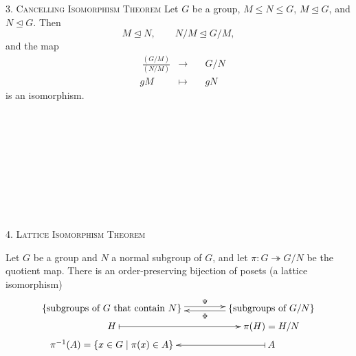 \documentclass[12pt]{amsart}
\begin{document}
\newpage

\begin{framed}
\textsc{3. Cancelling Isomorphism Theorem}
Let $G$ be a group, $M \leq N \leq G$, $M \trianglelefteq G$, and $N \trianglelefteq G$. Then 
$$M \trianglelefteq N, \qquad N/M \trianglelefteq G/M,$$ 
and the map
\[\begin{aligned} & \ \frac{(G/M)}{(N/M)}  &\longrightarrow & \quad G/N\\ 
& gM &\mapsto &\quad gN \end{aligned}\] 
is an isomorphism.

\

\

\

\

\

\textsc{4. Lattice Isomorphism Theorem}

Let $G$ be a group and $N$ a normal subgroup of $G$, and let $\pi\!: G \twoheadrightarrow G/N$ be the quotient map. There is an order-preserving bijection of posets (a lattice isomorphism)
$$\xymatrix@R=1mm@C=15mm{
\{\text{subgroups of $G$ that contain $N$}\} \ar@<0.5ex>[r]^-{\Psi} & \ar@<0.5ex>[l]^-{\Phi} \{\text{subgroups of $G/N$}\} \\
H \ar@{|->}[r] & \pi(H)= H/N \\
\pi^{-1}(A) = \{x \in G \mid \pi(x) \in A \} & A \ar@{|->}[l]
}$$


\end{framed}
\end{document}
